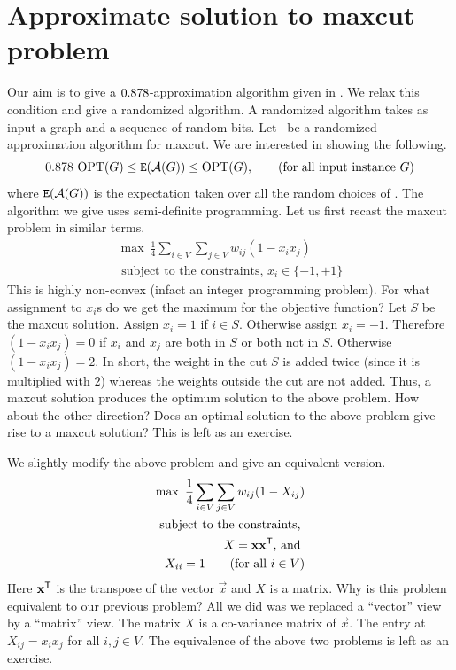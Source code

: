 \documentclass[12pt,
    driverfallback=dvipdfm,
 	openany,
    a4paper,
    toc=bibliography,
    twoside,
    numbers=noenddot]{article}              %
\begin{document}
\section{Approximate solution to maxcut problem}
Our aim is to give a $0.878$-approximation algorithm given in \cite{goemans1}. We relax this condition and give a randomized algorithm. A randomized algorithm takes as input a graph and a sequence of random bits. Let \A\ be a randomized approximation algorithm for maxcut. We are interested in showing the following.
\[
0.878 ~\mathrm{OPT}(G) \leq \mathtt{E}(\mathcal{A}(G)) \leq \mathrm{OPT}(G), \tag{for all input instance $G$}
\]
where $\mathtt{E}(\mathcal{A}(G))$ is the expectation taken over all the random choices of \A. The algorithm we give uses semi-definite programming. Let us first recast the maxcut problem in similar terms. 
\begin{align}
\max ~\frac{1}{4} \sum_{i \in V} \sum_{j \in V} w_{ij} (1-x_ix_j) \\
\text{ subject to the constraints, } x_i \in \{-1,+1\}  \nonumber 
\end{align}
This is highly non-convex (infact an integer programming problem). For what assignment to $x_i$s do we get the maximum for the objective function? Let $S$ be the maxcut solution. Assign $x_i=1$ if $i \in S$. Otherwise assign $x_i = -1$. Therefore $(1-x_ix_j) = 0$ if $x_i$ and $x_j$ are both in $S$ or both not in $S$. Otherwise $(1-x_ix_j) = 2$. In short, the weight in the cut $S$ is added twice (since it is multiplied with $2$) whereas the weights outside the cut are not added. Thus, a maxcut solution produces the optimum solution to the above problem. How about the other direction? Does an optimal solution to the above problem give rise to a maxcut solution? This is left as an exercise.

We slightly modify the above problem and give an equivalent version. 
\begin{align}
\label{p:maxcut}
\max ~\frac{1}{4} \sum_{i \in V} \sum_{j \in V} w_{ij} (1-X_{ij})  \\
\text{ subject to the constraints, } \nonumber \\
X = \mathbf x {\mathbf x}^{\mathsf{T}} \text{, and } \nonumber \\
X_{ii} = 1 \tag{for all $i \in V$}
\end{align}
Here ${ \mathbf x}^{\mathsf{T}}$ is the transpose of the vector $\vec x$ and $X$ is a matrix. Why is this problem equivalent to our previous problem? All we did was we replaced a ``vector'' view by a ``matrix'' view. The matrix $X$ is a co-variance matrix of $\vec x$. The entry at $X_{ij} = x_i x_j$ for all $i, j \in V$. The equivalence of the above two problems is left as an exercise.
\end{document}
